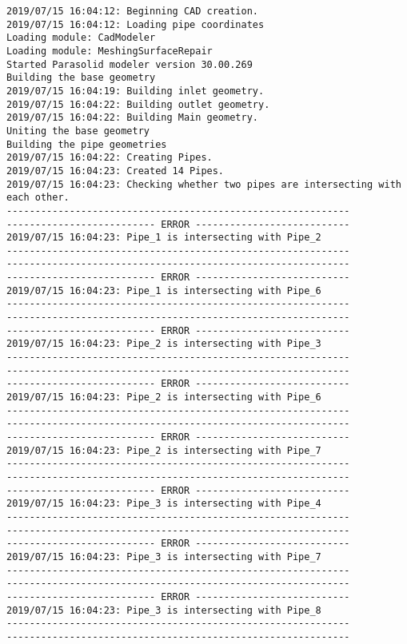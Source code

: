 \documentclass{article}
\begin{document}
{\tiny 
\begin{verbatim}
2019/07/15 16:04:12: Beginning CAD creation.
2019/07/15 16:04:12: Loading pipe coordinates
Loading module: CadModeler
Loading module: MeshingSurfaceRepair
Started Parasolid modeler version 30.00.269
Building the base geometry
2019/07/15 16:04:19: Building inlet geometry.
2019/07/15 16:04:22: Building outlet geometry.
2019/07/15 16:04:22: Building Main geometry.
Uniting the base geometry
Building the pipe geometries
2019/07/15 16:04:22: Creating Pipes.
2019/07/15 16:04:23: Created 14 Pipes.
2019/07/15 16:04:23: Checking whether two pipes are intersecting with each other.
------------------------------------------------------------
-------------------------- ERROR ---------------------------
2019/07/15 16:04:23: Pipe_1 is intersecting with Pipe_2
------------------------------------------------------------
------------------------------------------------------------
-------------------------- ERROR ---------------------------
2019/07/15 16:04:23: Pipe_1 is intersecting with Pipe_6
------------------------------------------------------------
------------------------------------------------------------
-------------------------- ERROR ---------------------------
2019/07/15 16:04:23: Pipe_2 is intersecting with Pipe_3
------------------------------------------------------------
------------------------------------------------------------
-------------------------- ERROR ---------------------------
2019/07/15 16:04:23: Pipe_2 is intersecting with Pipe_6
------------------------------------------------------------
------------------------------------------------------------
-------------------------- ERROR ---------------------------
2019/07/15 16:04:23: Pipe_2 is intersecting with Pipe_7
------------------------------------------------------------
------------------------------------------------------------
-------------------------- ERROR ---------------------------
2019/07/15 16:04:23: Pipe_3 is intersecting with Pipe_4
------------------------------------------------------------
------------------------------------------------------------
-------------------------- ERROR ---------------------------
2019/07/15 16:04:23: Pipe_3 is intersecting with Pipe_7
------------------------------------------------------------
------------------------------------------------------------
-------------------------- ERROR ---------------------------
2019/07/15 16:04:23: Pipe_3 is intersecting with Pipe_8
------------------------------------------------------------
------------------------------------------------------------

\end{verbatim}}
\end{document}
